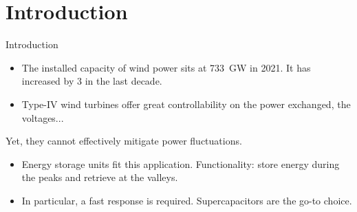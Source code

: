 \section{Introduction}
\begin{frame}{Introduction}
  \begin{itemize}
  \item The installed capacity of wind power sits at 733~GW in 2021. It has increased by 3 in the last decade.
  \item Type-IV wind turbines offer great controllability on the power exchanged, the voltages... 
  \end{itemize}
Yet, they cannot effectively mitigate power fluctuations.
\begin{itemize}
  \item Energy storage units fit this application. Functionality: store energy during the peaks and retrieve at the valleys.
  \item In particular, a fast response is required. Supercapacitors are the go-to choice.
\end{itemize}

\end{frame}

